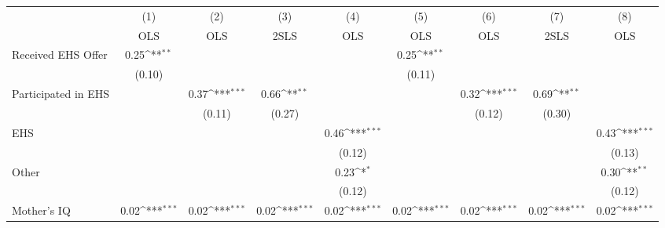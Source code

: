 {
\def\sym#1{\ifmmode^{#1}\else\(^{#1}\)\fi}
\begin{tabular}{l*{8}{c}}
\hline\hline
                    &\multicolumn{1}{c}{(1)}&\multicolumn{1}{c}{(2)}&\multicolumn{1}{c}{(3)}&\multicolumn{1}{c}{(4)}&\multicolumn{1}{c}{(5)}&\multicolumn{1}{c}{(6)}&\multicolumn{1}{c}{(7)}&\multicolumn{1}{c}{(8)}\\
                    &\multicolumn{1}{c}{OLS}&\multicolumn{1}{c}{OLS}&\multicolumn{1}{c}{2SLS}&\multicolumn{1}{c}{OLS}&\multicolumn{1}{c}{OLS}&\multicolumn{1}{c}{OLS}&\multicolumn{1}{c}{2SLS}&\multicolumn{1}{c}{OLS}\\
\hline
Received EHS Offer  &        0.25\sym{**} &                     &                     &                     &        0.25\sym{**} &                     &                     &                     \\
                    &      (0.10)         &                     &                     &                     &      (0.11)         &                     &                     &                     \\
[1em]
Participated in EHS &                     &        0.37\sym{***}&        0.66\sym{**} &                     &                     &        0.32\sym{***}&        0.69\sym{**} &                     \\
                    &                     &      (0.11)         &      (0.27)         &                     &                     &      (0.12)         &      (0.30)         &                     \\
[1em]
EHS                 &                     &                     &                     &        0.46\sym{***}&                     &                     &                     &        0.43\sym{***}\\
                    &                     &                     &                     &      (0.12)         &                     &                     &                     &      (0.13)         \\
[1em]
Other               &                     &                     &                     &        0.23\sym{*}  &                     &                     &                     &        0.30\sym{**} \\
                    &                     &                     &                     &      (0.12)         &                     &                     &                     &      (0.12)         \\
[1em]
Mother's IQ         &        0.02\sym{***}&        0.02\sym{***}&        0.02\sym{***}&        0.02\sym{***}&        0.02\sym{***}&        0.02\sym{***}&        0.02\sym{***}&        0.02\sym{***}\\

\end{tabular}}
